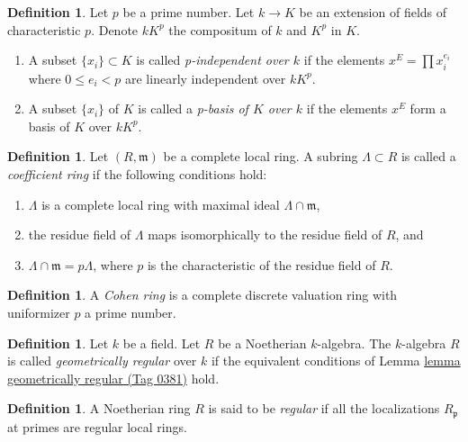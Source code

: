 \documentclass{amsart}
\theoremstyle{plain}
\theoremstyle{definition}
\newtheorem{definition}[subsection]{Definition}
\theoremstyle{remark}
\numberwithin{equation}{subsection}
\begin{document}
\begin{definition}
\label{definition-p-basis}
Let $p$ be a prime number. Let $k \to K$ be an extension of fields
of characteristic $p$. Denote $kK^p$ the compositum of $k$ and $K^p$
in $K$.
\begin{enumerate}
\item A subset $\{x_i\} \subset K$ is called {\it p-independent
over $k$} if the elements $x^E = \prod x_i^{e_i}$ where
$0 \leq e_i < p$ are linearly independent over $kK^p$.
\item A subset $\{x_i\}$ of $K$ is called a
{\it p-basis of $K$ over $k$} if the elements
$x^E$ form a basis of $K$ over $kK^p$.
\end{enumerate}
\end{definition}

\begin{definition}
\label{algebra-definition-coefficient-ring}
Let $(R, \mathfrak m)$ be a complete local ring.
A subring $\Lambda \subset R$ is
called a {\it coefficient ring} if the following conditions hold:
\begin{enumerate}
\item $\Lambda$ is a complete local ring with maximal ideal
$\Lambda \cap \mathfrak m$,
\item the residue field of $\Lambda$ maps isomorphically to the
residue field of $R$, and
\item $\Lambda \cap \mathfrak m = p\Lambda$, where $p$ is the characteristic
of the residue field of $R$.
\end{enumerate}
\end{definition}

\begin{definition}
\label{algebra-definition-cohen-ring}
A {\it Cohen ring} is a complete discrete valuation ring with
uniformizer $p$ a prime number.
\end{definition}

\begin{definition}
\label{algebra-definition-geometrically-regular}
Let $k$ be a field. Let $R$ be a Noetherian $k$-algebra.
The $k$-algebra $R$ is called {\it geometrically regular} over $k$ if
the equivalent conditions of Lemma \href{https://stacks.math.columbia.edu/tag/0381}{lemma geometrically regular (Tag 0381)} hold.
\end{definition}

\begin{definition}
\label{algebra-definition-regular}
A Noetherian ring $R$ is said to be {\it regular}
if all the localizations $R_{\mathfrak p}$ at primes are
regular local rings.
\end{definition}
\end{document}
